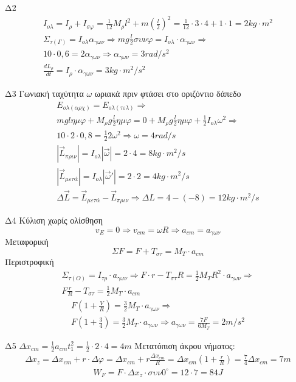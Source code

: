 \documentclass[greek]{beamer}
\begin{document}
\begin{frame}{Δ2}
 \begin{gather*}
  I_{ολ}=I_{ρ}+I_{σφ}=\frac{1}{12}M_ρl^2+m\left(\frac{l}{2}\right)^2=\frac{1}{12}\cdot 3\cdot 4 + 1\cdot 1=2kg\cdot m^2 \\
  Σ_{τ(Γ)}=I_{ολ}α_{γων}\Rightarrow mg\frac{l}{2}συνφ=I_{ολ}\cdot α_{γων}\Rightarrow \\
  10\cdot 0,6=2α_{γων}\Rightarrow α_{γων}=3rad/s^2 \\
  \frac{dL_ρ}{dt}=I_ρ\cdot α_{γων}=3kg\cdot m^2/s^2
 \end{gather*}
\end{frame}

\begin{frame}{Δ3}
 Γωνιακή ταχύτητα $ω$ ωριακά πριν φτάσει στο οριζόντιο δάπεδο
 \begin{gather*}
  E_{ολ(αρχ)}=E_{ολ(τελ)}\Rightarrow \\
  mglημφ+M_ρg\frac{l}{2}ημφ=0+M_ρg\frac{l}{2}ημφ+\frac{1}{2}I_{ολ}ω^2\Rightarrow \\
  10\cdot 2\cdot 0,8=\frac{1}{2}2ω^2\Rightarrow ω=4rad/s \\
  |\overrightarrow{L}_{πριν}|=I_{ολ}|\overrightarrow{ω}|=2\cdot 4=8kg\cdot m^2/s \\
  |\overrightarrow{L}_{μετά}|=I_{ολ}|\overrightarrow{ω}'|=2\cdot 2=4kg\cdot m^2/s \\
  Δ\overrightarrow{L}=\overrightarrow{L}_{μετά}-\overrightarrow{L}_{πριν}\Rightarrow ΔL=4-(-8)=12kg\cdot m^2/s
 \end{gather*}
\end{frame}


\begin{frame}{Δ4}
 Κύλιση χωρίς ολίσθηση
 $$v_E=0\Rightarrow v_{cm}=ωR\Rightarrow a_{cm}=a_{γων}$$
 Μεταφορική
 $$ΣF=F+T_{στ}=M_T\cdot a_{cm}$$
 Περιστροφική
 \begin{gather*}
  Σ_{τ(Ο)}=I_{τρ}\cdot a_{γων} \Rightarrow F\cdot r-T_{στ}R=\frac{1}{2}M_TR^2\cdot a_{γων}\Rightarrow \\
  F\frac{r}{R}-T_{στ}=\frac{1}{2}M_T\cdot a_{cm}
 \end{gather*}
 \begin{gather*}
  F\left(1+\frac{V}{R}\right)=\frac{3}{2}M_T\cdot a_{γων}\Rightarrow \\
  F\left(1+\frac{3}{4}\right)=\frac{3}{2}M_T\cdot a_{γων}\Rightarrow a_{γων}=\frac{7F}{6M_T}=2m/s^2
 \end{gather*}
\end{frame}

\begin{frame}{Δ5}
 $Δx_{cm}=\frac{1}{2}a_{cm}t_1^2=\frac{1}{2}\cdot 2 \cdot 4=4m$
 Μετατόπιση άκρου νήματος:
 \begin{gather*}
  Δx_z=Δx_{cm}+r\cdot Δφ=Δx_{cm}+r\frac{Δx_{cm}}{R}=Δx_{cm}\left(1+\frac{r}{R}\right)=\frac{7}{4}Δx_{cm}=7m
 \end{gather*}
 \begin{gather*}
  W_F=F\cdot Δx_z\cdot συν0^\circ=12\cdot 7=84J
 \end{gather*}
\end{frame}
\end{document}
